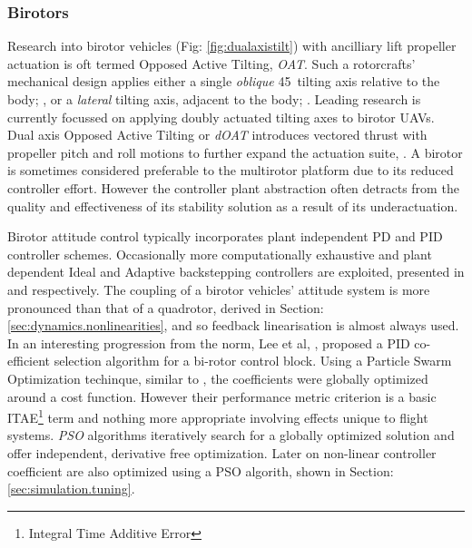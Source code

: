 \subsubsection*{Birotors}
Research into birotor vehicles (Fig: \ref{fig:dualaxistilt}) with ancilliary lift propeller actuation is oft termed Opposed Active Tilting, \emph{OAT}. Such a rotorcrafts' mechanical design applies either a single \emph{oblique} 45\textdegree ~tilting axis relative to the body; \cite{smalltwotilting,obliquepitch,passiveobliquetilting}, or a \emph{lateral} tilting axis, adjacent to the body; \cite{tiltrotorUAV,adaptivebackstep,tiltrotorcontrol,tpheonix}. Leading research is currently focussed on applying doubly actuated tilting axes to birotor UAVs. Dual axis Opposed Active Tilting or \emph{dOAT} introduces vectored thrust with propeller pitch and roll motions to further expand the actuation suite, \cite{gres2007,opposedlateraldualaxis}. A birotor is sometimes considered preferable to the multirotor platform due to its reduced controller effort. However the controller plant abstraction often detracts from the quality and effectiveness of its stability solution as a result of its underactuation. 
\par
Birotor attitude control typically incorporates plant independent PD \cite{obliquepitch} and PID \cite{tiltrotorUAV} controller schemes. Occasionally more computationally exhaustive and plant dependent Ideal and Adaptive backstepping controllers are exploited, presented in \cite{smalltwotilting,tpheonix} and \cite{adaptivebackstep} respectively. The coupling of a birotor vehicles' attitude system is more pronounced than that of a quadrotor, derived in Section: \ref{sec:dynamics.nonlinearities}, and so feedback linearisation is almost always used. In an interesting progression from the norm, Lee et al,  \cite{autopilotPSO}, proposed a PID co-efficient selection algorithm for a bi-rotor control block. Using a Particle Swarm Optimization techinque, similar to \cite{adaptivepso}, the coefficients were globally optimized around a cost function. However their performance metric criterion is a basic ITAE\footnote{Integral Time Additive Error} term and nothing more appropriate involving effects unique to flight systems. \emph{PSO} algorithms iteratively search for a globally optimized solution and offer independent, derivative free optimization. Later on non-linear controller coefficient are also optimized using a PSO algorith, shown in Section:\ref{sec:simulation.tuning}.
\par
